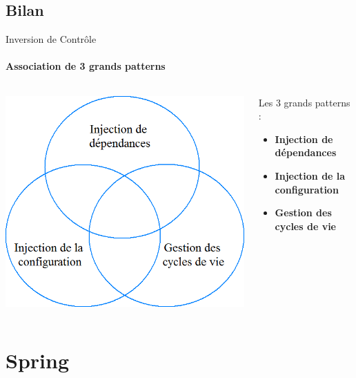 \documentclass[compress]{beamer}%
\begin{document}
\subsection{Bilan}

\begin{frame}{Inversion de Contrôle}
	\framesubtitle{Association de 3 grands patterns}
	
	\begin{columns}
		\begin{column}{0.5\textwidth}
			\includegraphics[width=\textwidth]{images/spring_ioc.png}
		\end{column}
		\begin{column}{0.5\textwidth}
			Les 3 grands patterns :
			\begin{itemize}
			\item \textbf{Injection de dépendances}	
			\item \textbf{Injection de la configuration}
			\item \textbf{Gestion des cycles de vie}
			\end{itemize}
		\end{column}
	\end{columns}

\end{frame}


\section{Spring}
\end{document}
